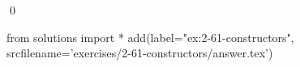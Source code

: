 
\begin{ex}
  \label{ex:2-61-constructors}
  
  \qed
\end{ex}
\begin{python0}
from solutions import *
add(label="ex:2-61-constructors",
    srcfilename='exercises/2-61-constructors/answer.tex')
\end{python0}
